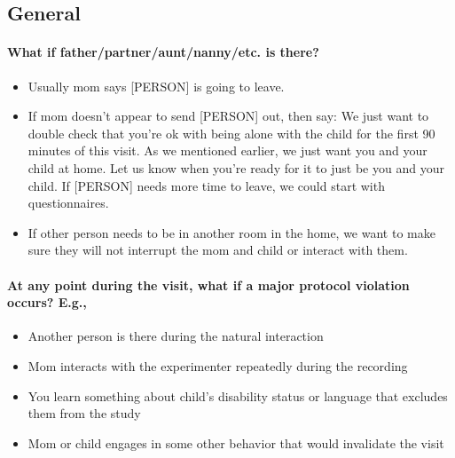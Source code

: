 \documentclass[
]{book}
\providecommand{\tightlist}{%
  \setlength{\itemsep}{0pt}\setlength{\parskip}{0pt}}
\begin{document}
\hypertarget{general}{%
\subsection{General}\label{general}}

\hypertarget{what-if-fatherpartnerauntnannyetc.-is-there}{%
\paragraph*{What if father/partner/aunt/nanny/etc. is there?}\label{what-if-fatherpartnerauntnannyetc.-is-there}}

\begin{itemize}
\tightlist
\item
  Usually mom says {[}PERSON{]} is going to leave.\\
\item
  If mom doesn't appear to send {[}PERSON{]} out, then say: We just want to double check that you're ok with being alone with the child for the first 90 minutes of this visit. As we mentioned earlier, we just want you and your child at home. Let us know when you're ready for it to just be you and your child. If {[}PERSON{]} needs more time to leave, we could start with questionnaires.
\item
  If other person needs to be in another room in the home, we want to make sure they will not interrupt the mom and child or interact with them.
\end{itemize}

\hypertarget{at-any-point-during-the-visit-what-if-a-major-protocol-violation-occurs-e.g.}{%
\paragraph*{At any point during the visit, what if a major protocol violation occurs? E.g.,}\label{at-any-point-during-the-visit-what-if-a-major-protocol-violation-occurs-e.g.}}

\begin{itemize}
\tightlist
\item
  Another person is there during the natural interaction
\item
  Mom interacts with the experimenter repeatedly during the recording
\item
  You learn something about child's disability status or language that excludes them from the study
\item
  Mom or child engages in some other behavior that would invalidate the visit
\end{itemize}
\end{document}
